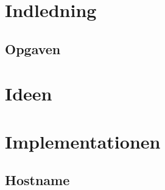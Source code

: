 \documentclass{article}
\begin{document}

\tableofcontents
\pagebreak

\section{Indledning}

\subsection{Opgaven}

\section{Ideen}

\section{Implementationen}
\subsection{Hostname}
\end{document}

